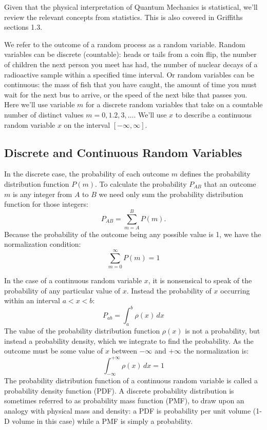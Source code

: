 \documentclass[12pt]{book}
\begin{document}
Given that the physical interpretation of Quantum Mechanics is statistical, we'll review the relevant concepts from statistics. This is also covered in Griffiths sections 1.3.  

We refer to the outcome of a random process as a random variable.  Random variables can be discrete (countable): heads or tails from a coin flip, the number of children the next person you meet has had, the number of nuclear decays of a radioactive sample within a specified time interval.  Or random variables can be continuous:  the mass of fish that you have caught, the amount of time you must wait for the next bus to arrive, or the speed of the next bike that passes you.  Here we'll use variable $m$ for a discrete random variables that take on a countable number of distinct values $m=0,1.2,3,\ldots$.  We'll use $x$ to describe a continuous random variable $x$ on the interval $[-\infty, \infty]$. 

\subsection{Discrete and Continuous Random Variables}

In the discrete case, the probability of each outcome $m$ defines the probability distribution function $P(m)$.  To calculate the probability $P_{AB}$ that an outcome $m$ is any integer from $A$ to $B$ we need only sum the probability distribution function for those integers:
\begin{displaymath}
P_{AB} = \sum_{m=A}^{B} P(m).
\end{displaymath}
Because the probability of the outcome being any possible value is 1, we have the normalization condition:
\begin{displaymath}
\sum_{m=0}^{\infty} P(m) = 1
\end{displaymath}

In the case of a continuous random variable $x$, it is nonsensical to speak of the probability of any particular value of $x$.  Instead the probability of $x$ occurring within an interval $a < x < b$:
\begin{displaymath}
P_{ab} = \int_{a}^{b} \rho(x) \, dx
\end{displaymath}
The value of the probability distribution function $\rho(x)$ is not a probability, but instead a probability density, which we integrate to find the probability.  As the outcome must be some value of $x$ between $-\infty$ and $+\infty$ the normalization is:
\begin{displaymath}
\int_{-\infty}^{+\infty} \rho(x) \, dx = 1
\end{displaymath}
The probability distribution function of a continuous random variable is called a probability density function (PDF).  A discrete probability distribution is sometimes referred to
as probability mass function (PMF), to draw upon an analogy with physical mass and density: a PDF is probability per unit volume (1-D volume in this case) while
a PMF is simply a probability.
\end{document}
